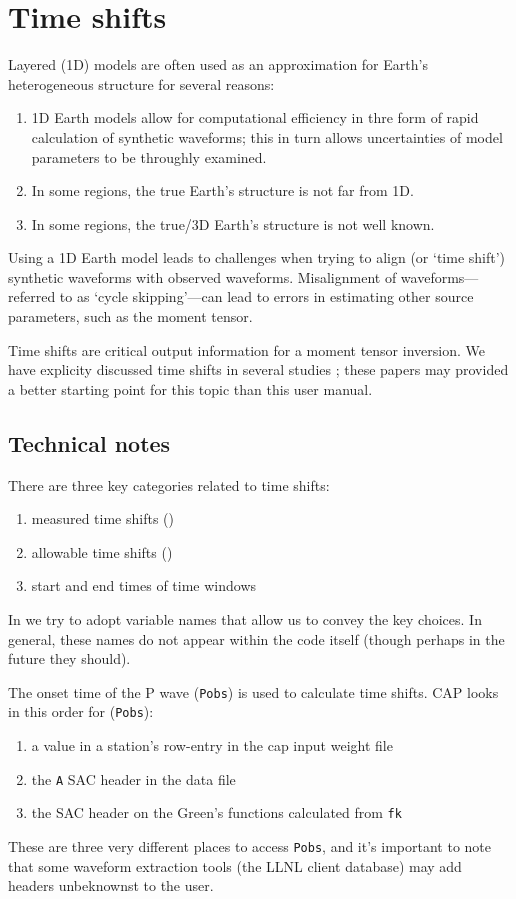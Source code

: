 \section{Time shifts}
\label{sec:tshift}

Layered (1D) models are often used as an approximation for Earth's heterogeneous structure for several reasons:
%
\begin{enumerate}
\item 1D Earth models allow for computational efficiency in thre form of rapid calculation of synthetic waveforms; this in turn allows uncertainties of model parameters to be throughly examined.
\item In some regions, the true Earth's structure is not far from 1D.
\item In some regions, the true/3D Earth's structure is not well known.
\end{enumerate}
%
Using a 1D Earth model leads to challenges when trying to align (or `time shift')  synthetic waveforms with observed waveforms. Misalignment of waveforms---referred to as `cycle skipping'---can lead to errors in estimating other source parameters, such as the moment tensor.

Time shifts are critical output information for a moment tensor inversion. We have explicity discussed time shifts in several studies \citep{SilwalTape2016,AlvizuriTape2016,Alvizuri2018,AlvizuriTape2018}; these papers may provided a better starting point for this topic than this user manual.

\subsection*{Technical notes}

There are three key categories related to time shifts:
\begin{enumerate}
\item measured time shifts ()
\item allowable time shifts ()
\item start and end times of time windows
\end{enumerate}

In  we try to adopt variable names that allow us to convey the key choices. In general, these names do not appear within the code itself (though perhaps in the future they should).

The onset time of the P wave (\verb+Pobs+) is used to calculate time shifts. CAP looks in this order for (\verb+Pobs+):
%
\begin{enumerate}
\item a value in a station's row-entry in the cap input weight file
\item the \verb+A+ SAC header in the data file
\item the SAC header on the Green's functions calculated from \verb+fk+
\end{enumerate}
%
These are three very different places to access \verb+Pobs+, and it's important to note that some waveform extraction tools (\eg the LLNL client database) may add headers unbeknownst to the user.

